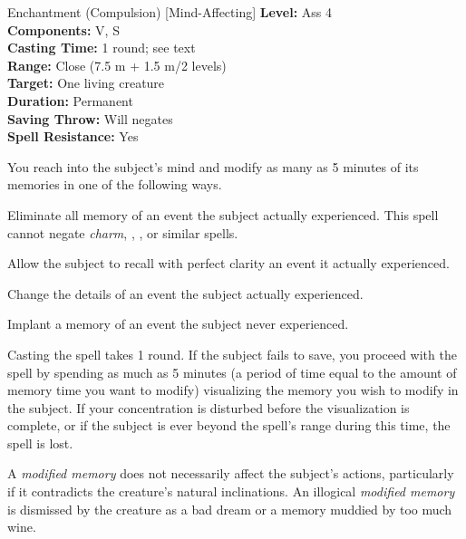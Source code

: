 {Enchantment (Compulsion) [Mind-Affecting]}
{
	\textbf{Level:}
	Ass 4\\
	\textbf{Components:}
	V, S\\
	\textbf{Casting Time:}
	1 round; see text\\
	\textbf{Range:}
	Close (7.5 m + 1.5 m/2 levels)\\
	\textbf{Target:}
	One living creature\\
	\textbf{Duration:}
	Permanent\\
	\textbf{Saving Throw:}
	Will negates\\
	\textbf{Spell Resistance:}
	Yes\\
}
{
	You reach into the subject's mind and modify as many as 5 minutes of its memories in one of the following ways.

\begin{itemize*}
\item Eliminate all memory of an event the subject actually experienced. This spell cannot negate \emph{charm}, , , or similar spells.
\item Allow the subject to recall with perfect clarity an event it actually experienced.
\item Change the details of an event the subject actually experienced.
\item Implant a memory of an event the subject never experienced.
\end{itemize*}

	Casting the spell takes 1 round. If the subject fails to save, you proceed with the spell by spending as much as 5 minutes (a period of time equal to the amount of memory time you want to modify) visualizing the memory you wish to modify in the subject. If your concentration is disturbed before the visualization is complete, or if the subject is ever beyond the spell's range during this time, the spell is lost.

	A \emph{modified memory} does not necessarily affect the subject's actions, particularly if it contradicts the creature's natural inclinations. An illogical \emph{modified memory} is dismissed by the creature as a bad dream or a memory muddied by too much wine.

}
